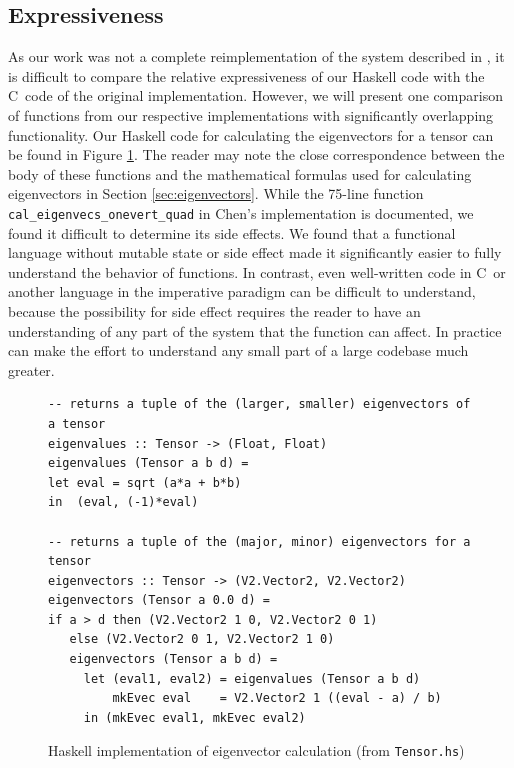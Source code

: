 \documentclass[twocolumn]{article}
\def \cpp {C\nolinebreak[4]\hspace{-.05em}\raisebox{.4ex}{\tiny\bf ++}~}
\begin{document}
\subsection{Expressiveness}
As our work was not a complete reimplementation of the system described in
\cite{chen}, it is difficult to compare the relative expressiveness of our
Haskell code with the \cpp code of the original implementation. However, we
will present one comparison of functions from our respective implementations
with significantly overlapping functionality. Our Haskell code for calculating
the eigenvectors for a tensor can be found in Figure \ref{fig:evecs}. The
reader may note the close correspondence between the body of these functions
and the mathematical formulas used for calculating eigenvectors in Section
\ref{sec:eigenvectors}.  While the 75-line function
\texttt{cal\_eigenvecs\_onevert\_quad} in Chen's implementation is documented,
we found it difficult to determine its side effects. We found that a functional
language without mutable state or side effect made it significantly easier to
fully understand the behavior of functions.  In contrast, even well-written
code in \cpp or another language in the imperative paradigm can be difficult to
understand, because the possibility for side effect requires the reader to have
an understanding of any part of the system that the function can affect. In
practice can make the effort to understand any small part of a large codebase
much greater.

\begin{figure}[t!]
\begin{Verbatim}[frame=single]
-- returns a tuple of the (larger, smaller) eigenvectors of a tensor
eigenvalues :: Tensor -> (Float, Float)
eigenvalues (Tensor a b d) =
let eval = sqrt (a*a + b*b)
in  (eval, (-1)*eval)

-- returns a tuple of the (major, minor) eigenvectors for a tensor
eigenvectors :: Tensor -> (V2.Vector2, V2.Vector2)
eigenvectors (Tensor a 0.0 d) =
if a > d then (V2.Vector2 1 0, V2.Vector2 0 1)
   else (V2.Vector2 0 1, V2.Vector2 1 0)
   eigenvectors (Tensor a b d) =
     let (eval1, eval2) = eigenvalues (Tensor a b d)
         mkEvec eval    = V2.Vector2 1 ((eval - a) / b)
     in (mkEvec eval1, mkEvec eval2)
\end{Verbatim}

\caption{Haskell implementation of eigenvector calculation (from
            \texttt{Tensor.hs})}
\label{fig:evecs}
\end{figure}
\end{document}
